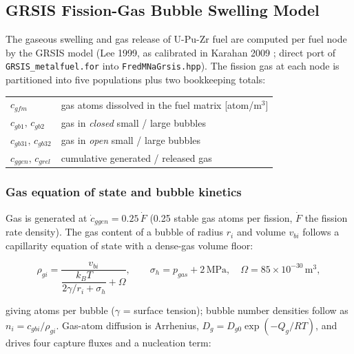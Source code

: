 \begin{refsection}
\subsection{GRSIS Fission-Gas Bubble Swelling Model}
\label{sec:grsis}

The gaseous swelling and gas release of U-Pu-Zr fuel are computed per fuel
node by the GRSIS model (Lee 1999, as calibrated in Karahan 2009
\cite{karahan2009}; direct port of \texttt{GRSIS\_metalfuel.for} into
\texttt{FredMNaGrsis.hpp}).  The fission gas at each node is partitioned
into five populations plus two bookkeeping totals:

\begin{center}
\begin{tabular}{ll}
\toprule
$c_{gfm}$          & gas atoms dissolved in the fuel matrix [atom/m$^3$] \\
$c_{gb1},\,c_{gb2}$  & gas in \emph{closed} small / large bubbles \\
$c_{gb31},\,c_{gb32}$& gas in \emph{open} small / large bubbles \\
$c_{ggen},\,c_{grel}$& cumulative generated / released gas \\
\bottomrule
\end{tabular}
\end{center}

\subsubsection{Gas equation of state and bubble kinetics}

Gas is generated at $\dot c_{ggen} = 0.25\,\dot F$ (0.25 stable gas atoms
per fission, $\dot F$ the fission rate density).  The gas content of a
bubble of radius $r_i$ and volume $v_{bi}$ follows a capillarity equation of
state with a dense-gas volume floor:

\begin{equation}
  \rho_{gi} = \frac{v_{bi}}{\dfrac{k_B T}{2\gamma/r_i + \sigma_h} + \Omega},
  \qquad \sigma_h = p_{gas} + 2\,\mathrm{MPa},
  \quad \Omega = 85\times10^{-30}\,\mathrm{m^3},
  \label{eq:grsis_eos}
\end{equation}

giving atoms per bubble ($\gamma$ = surface tension); bubble number
densities follow as $n_i = c_{gbi}/\rho_{gi}$.  Gas-atom diffusion is
Arrhenius, $D_g = D_{g0}\exp(-Q_g/RT)$, and drives four capture fluxes and
a nucleation term:


\end{refsection}
